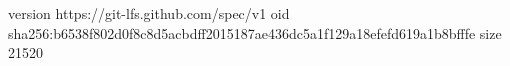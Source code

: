 version https://git-lfs.github.com/spec/v1
oid sha256:b6538f802d0f8c8d5acbdff2015187ae436dc5a1f129a18efefd619a1b8bfffe
size 21520
